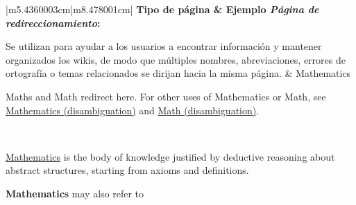 \documentclass[letterpaper]{article}
\makeatletter
\newcommand\arraybslash{\let\\\@arraycr}
\makeatother
\begin{document}
\begin{center}
\label{seq:refTable5}\tablehead{}
\begin{supertabular}{|m{5.4360003cm}|m{8.478001cm}|}
\hline
\centering {}\bfseries Tipo de p\'agina &
\centering\arraybslash {}\bfseries Ejemplo\\\hline
{ \textit{P\'agina de redireccionamiento}:}

 Se utilizan para ayudar a los usuarios a
encontrar informaci\'on y mantener organizados los wikis, de modo que
m\'ultiples nombres, abreviaciones, errores de ortograf\'ia o temas
relacionados se dirijan hacia la misma p\'agina. &
{ Mathematics}

{ {\textquotedbl}Maths{\textquotedbl} and
{\textquotedbl}Math{\textquotedbl} redirect here. For other uses of
{\textquotedbl}Mathematics{\textquotedbl} or
{\textquotedbl}Math{\textquotedbl}, see
\href{http://en.wikipedia.org/wiki/Mathematics_(disambiguation)}{Mathematics
(disambiguation)} and
\href{http://en.wikipedia.org/wiki/Math_(disambiguation)}{Math
(disambiguation)}.}

~

{
\href{http://en.wikipedia.org/wiki/Mathematics}{Mathematics} is the
body of knowledge justified by deductive reasoning about abstract
structures, starting from axioms and definitions.}

{ \textbf{Mathematics} may also refer to}


\end{supertabular}
\end{center}
\end{document}
